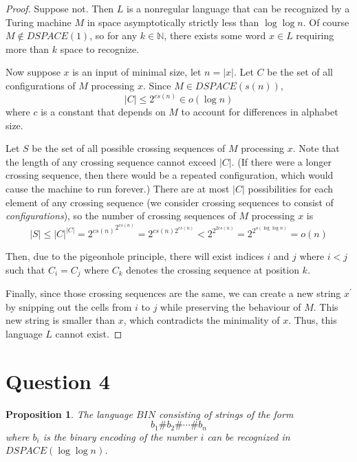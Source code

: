 \documentclass[11pt,letterpaper]{article}
\newtheorem{proposition}{Proposition}
\begin{document}
\begin{proof}
    Suppose not. Then $L$ is a nonregular language that can be recognized by a
    Turing machine $M$ in space asymptotically strictly less than
    $\log \log n$. Of course $M \notin DSPACE(1)$, so for any
    $k \in \mathbb{N}$, there exists some word $x \in L$ requiring more than
    $k$ space to recognize.

    Now suppose $x$ is an input of minimal size, let $n = |x|$. Let $C$ be the
    set of all configurations of $M$ processing $x$. Since
    $M \in DSPACE(s(n))$,
    $$
    |C| \leq 2^{c s(n)} \in o(\log n)
    $$
    where $c$ is a constant that depends on $M$ to account for differences in
    alphabet size.

    Let $S$ be the set of all possible crossing sequences of $M$ processing
    $x$. Note that the length of any crossing sequence cannot exceed $|C|$. (If
    there were a longer crossing sequence, then there would be a repeated
    configuration, which would cause the machine to run forever.) There are at
    most $|C|$ possibilities for each element of any crossing sequence (we
    consider crossing sequences to consist of \emph{configurations}), so the
    number of crossing sequences of $M$ processing $x$ is
    $$
    |S| \leq |C|^{|C|} = {2^{c s(n)}}^{2^{c s(n)}} = 2^{c s(n) 2^{c s(n)}}
    < 2^{2^{2 c s(n)}} = 2^{2^{o(\log \log n)}} = o(n)
    $$

    Then, due to the pigeonhole principle, there will exist indices $i$ and $j$
    where $i < j$ such that $C_i = C_j$ where $C_k$ denotes the crossing
    sequence at position $k$.

    Finally, since those crossing sequences are the same, we can create a new
    string $x^\prime$ by snipping out the cells from $i$ to $j$ while
    preserving the behaviour of $M$. This new string is smaller than $x$, which
    contradicts the minimality of $x$. Thus, this language $L$ cannot exist.
\end{proof}

\section*{Question 4}

\begin{proposition}
    The language $BIN$ consisting of strings of the form
    $$
    b_1 \# b_2 \# \cdots \# b_n
    $$
    where $b_i$ is the binary encoding of the number $i$ can be recognized in
    $DSPACE(\log \log n)$.
\end{proposition}
\end{document}
